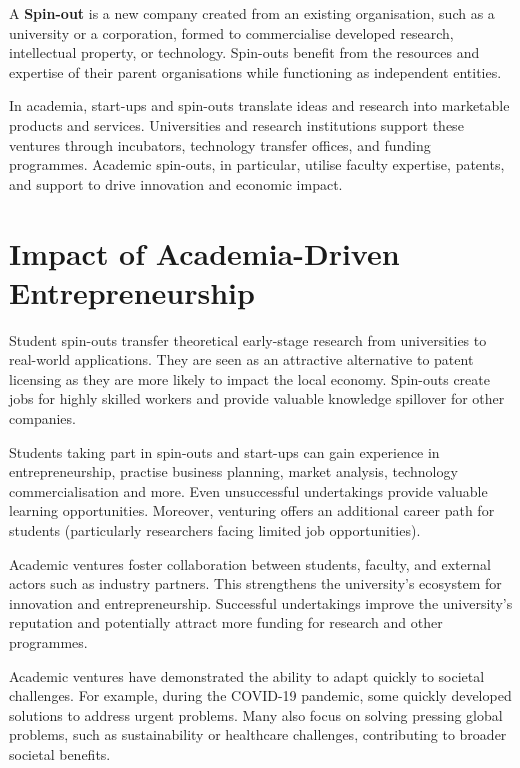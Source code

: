A \textbf{Spin-out} is a new company created from an existing organisation, such as a university or a corporation, formed to commercialise developed research, intellectual property, or technology. Spin-outs benefit from the resources and expertise of their parent organisations while functioning as independent entities.\cite{mfmac_spin-out}

In academia, start-ups and spin-outs translate ideas and research into marketable products and services. Universities and research institutions support these ventures through incubators, technology transfer offices, and funding programmes. Academic spin-outs, in particular, utilise faculty expertise, patents, and support to drive innovation and economic impact.

\section{Impact of Academia-Driven Entrepreneurship}
Student spin-outs transfer theoretical early-stage research from universities to real-world applications. They are seen as an attractive alternative to patent licensing as they are more likely to impact the local economy. Spin-outs create jobs for highly skilled workers and provide valuable knowledge spillover for other companies.\cite{Caputo_spin-offs-impact}

Students taking part in spin-outs and start-ups can gain experience in entrepreneurship, practise business planning, market analysis, technology commercialisation and more. Even unsuccessful undertakings provide valuable learning opportunities. Moreover, venturing offers an additional career path for students (particularly researchers facing limited job opportunities).\cite{kauffman_tech-transfer}

Academic ventures foster collaboration between students, faculty, and external actors such as industry partners. This strengthens the university's ecosystem for innovation and entrepreneurship. Successful undertakings improve the university's reputation and potentially attract more funding for research and other programmes.

Academic ventures have demonstrated the ability to adapt quickly to societal challenges. For example, during the COVID-19 pandemic, some quickly developed solutions to address urgent problems. Many also focus on solving pressing global problems, such as sustainability or healthcare challenges, contributing to broader societal benefits.\cite{Battaglia_spin-off-response}

